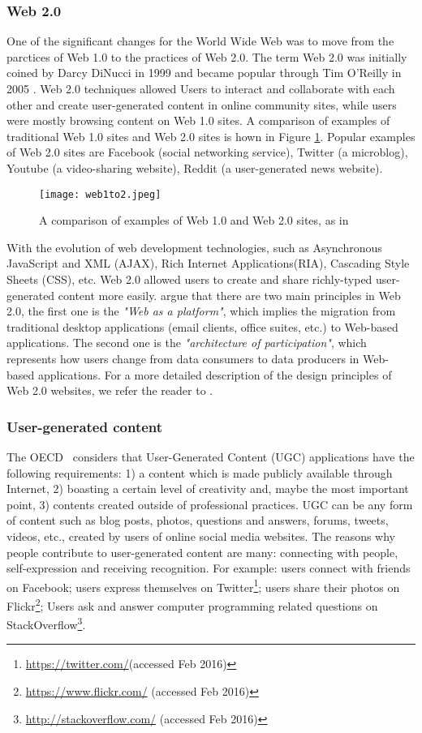 \subsubsection{Web 2.0}
One of the significant changes for the World Wide Web was to move from the parctices of Web 1.0 to the practices of Web 2.0. The term Web 2.0 was initially coined by Darcy DiNucci in 1999  \cite{dinucci2012fragmented} and became popular through Tim O'Reilly in 2005 \cite{o2009design}. Web 2.0 techniques allowed Users to interact and collaborate with each other and create user-generated content in online community sites, while users were mostly browsing content on Web 1.0 sites. A comparison of examples of traditional Web 1.0 sites and Web 2.0 sites is hown in Figure \ref{fig:web1to2}. Popular examples of Web 2.0 sites are Facebook (social networking service), Twitter (a microblog), Youtube (a video-sharing website), Reddit (a user-generated news website).

\begin{figure}%
\centering
\texttt{[image: web1to2.jpeg]}  
\caption{A comparison of examples of Web 1.0 and Web 2.0 sites, as in \cite{o2009design}}
\label{fig:web1to2} 
\end{figure}
With the evolution of web development technologies, such as Asynchronous JavaScript and XML (AJAX), Rich Internet Applications(RIA), Cascading Style Sheets (CSS), etc. Web 2.0 allowed users to create and share richly-typed user-generated content more easily. \cite{passant2009technologies} argue that there are two main principles in Web 2.0, the first one is the \textit{"Web as a platform"}, which implies the migration from traditional desktop applications (email clients, office suites, etc.) to Web-based applications. The second one is the \textit{"architecture of participation"}, which represents how users change from data consumers to data producers in Web-based applications. For a more detailed description of the design principles of Web 2.0 websites, we refer the reader to \cite{o2009design}. 


\subsubsection{User-generated content}
The OECD~\cite{web2007web} considers that User-Generated Content (UGC) applications have the following requirements: 1) a content which is made publicly available through Internet, 2) boasting a certain level of creativity and, maybe the most important point, 3) contents created outside of professional practices. UGC can be any form of content such as blog posts, photos, questions and answers, forums, tweets, videos, etc., created by users of online social media websites. \cite{moens2014mining} The reasons why people contribute to user-generated content are many: connecting with people, self-expression and receiving recognition. For example: users connect with friends on Facebook; users express themselves on Twitter\footnote{\url{https://twitter.com/}(accessed Feb 2016)}; users share their photos on Flickr\footnote{\url{https://www.flickr.com/} (accessed Feb 2016)}; Users ask and answer computer programming related questions on StackOverflow\footnote{\url{http://stackoverflow.com/} (accessed Feb 2016)}. 

